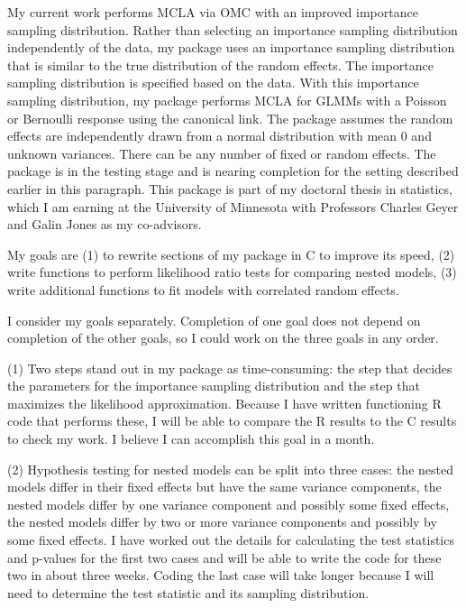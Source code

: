 \documentclass[12pt]{article}
\begin{document}
My current work performs MCLA via OMC with an improved importance sampling distribution.  Rather than selecting an importance sampling distribution independently of the data, my  package uses an importance sampling distribution that is similar to the true distribution of the random effects.  The importance sampling distribution is specified based on the data.  With this importance sampling distribution, my package performs MCLA for GLMMs with a Poisson or Bernoulli response using the canonical link.  The package assumes the random effects are independently drawn from a normal distribution with mean 0 and unknown variances. There can be any number of fixed or random effects.  The package is in the testing stage and is nearing completion for the setting described earlier in this paragraph.  This package is part of my doctoral thesis in statistics, which I am earning at the University of Minnesota with Professors Charles Geyer and Galin Jones as my co-advisors.




My goals are  (1) to rewrite sections of my package in C to  improve its speed, (2) write functions to perform likelihood ratio tests for comparing nested models, (3) write additional functions to fit models with correlated random effects.  




I consider my  goals separately. Completion of one goal does not depend on completion of the other goals, so I could work on the three goals in any order.

(1) Two steps stand out in my package as time-consuming: the step that decides the parameters for the importance sampling distribution and the step that maximizes the likelihood approximation. Because I have written functioning R code that performs these, I will be able to compare the R results to the C results to check my work.  I believe I can accomplish this goal in a month.

(2)  Hypothesis testing for nested models can be split into three cases: the nested models differ in their fixed effects but have the same variance components, the nested models differ by one variance component and possibly some fixed effects, the nested models differ by two or more variance components and possibly by some fixed effects. I have worked out the details for calculating the test statistics and p-values for the first two cases and will  be able to write the code for these two in about three weeks.  Coding the last case will take longer because I will need to determine the test statistic and its sampling distribution.  
\end{document}

